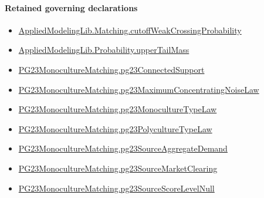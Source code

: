 \documentclass[10pt]{article}
\begin{document}
\paragraph{Retained governing declarations}
\begin{itemize}\raggedright
\item \hyperlink{governing-declaration-b9347ec8cbc98b34}{Applied\allowbreak{}Modeling\allowbreak{}Lib.\allowbreak{}Matching.\allowbreak{}cutoff\allowbreak{}Weak\allowbreak{}Crossing\allowbreak{}Probability}
\item \hyperlink{governing-declaration-f983ca9c59dc317f}{Applied\allowbreak{}Modeling\allowbreak{}Lib.\allowbreak{}Probability.\allowbreak{}upper\allowbreak{}Tail\allowbreak{}Mass}
\item \hyperlink{paper-prerequisite-3ea91dd17eec5e64}{PG23\allowbreak{}Monoculture\allowbreak{}Matching.\allowbreak{}pg23\allowbreak{}Connected\allowbreak{}Support}
\item \hyperlink{paper-prerequisite-8df4ad9724d0cb72}{PG23\allowbreak{}Monoculture\allowbreak{}Matching.\allowbreak{}pg23\allowbreak{}Maximum\allowbreak{}Concentrating\allowbreak{}Noise\allowbreak{}Law}
\item \hyperlink{paper-prerequisite-e248b62a880a6917}{PG23\allowbreak{}Monoculture\allowbreak{}Matching.\allowbreak{}pg23\allowbreak{}Monoculture\allowbreak{}Type\allowbreak{}Law}
\item \hyperlink{paper-prerequisite-57a6e28ae64a74da}{PG23\allowbreak{}Monoculture\allowbreak{}Matching.\allowbreak{}pg23\allowbreak{}Polyculture\allowbreak{}Type\allowbreak{}Law}
\item \hyperlink{paper-prerequisite-3fb2e1ac28891e7d}{PG23\allowbreak{}Monoculture\allowbreak{}Matching.\allowbreak{}pg23\allowbreak{}Source\allowbreak{}Aggregate\allowbreak{}Demand}
\item \hyperlink{paper-prerequisite-55bbf5d44984bdf1}{PG23\allowbreak{}Monoculture\allowbreak{}Matching.\allowbreak{}pg23\allowbreak{}Source\allowbreak{}Market\allowbreak{}Clearing}
\item \hyperlink{paper-prerequisite-26aa95cb7c69a47b}{PG23\allowbreak{}Monoculture\allowbreak{}Matching.\allowbreak{}pg23\allowbreak{}Source\allowbreak{}Score\allowbreak{}Level\allowbreak{}Null}
\end{itemize}
\end{document}

